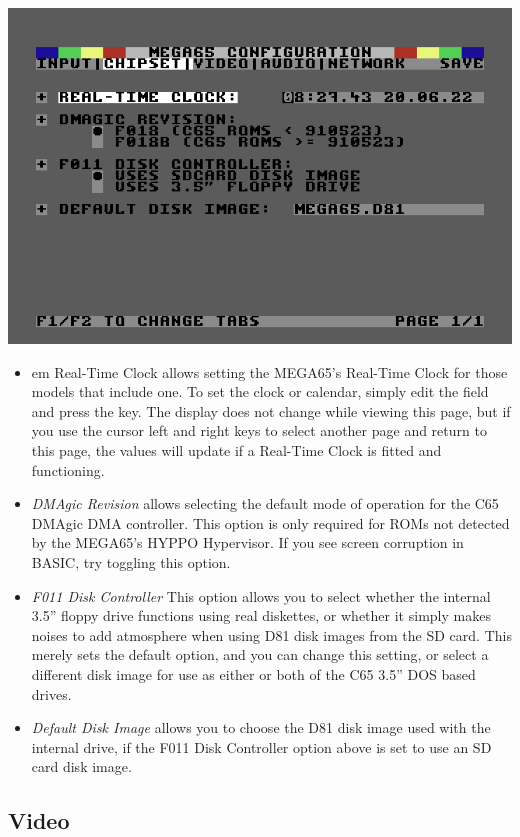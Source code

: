\includegraphics[width=\linewidth]{images/ss-m65config-2.png}

\begin{itemize}
  \item{em Real-Time Clock} allows setting the MEGA65's Real-Time
    Clock for those models that include one.  To set the clock or
    calendar, simply edit the field and press the 
    key.  The display does not change while viewing this page, but if
    you use the cursor left and right keys to select another page and
    return to this page, the values will update if a Real-Time Clock
    is fitted and functioning.
  \item{\em DMAgic Revision} allows selecting the default mode of
    operation for the C65 DMAgic DMA controller.  This option is only
    required for ROMs not detected by the MEGA65's HYPPO Hypervisor.
    If you see screen corruption in BASIC,
    try toggling this option.
  \item{\em F011 Disk Controller}
    This option allows you to select whether the internal 3.5'' floppy
    drive functions using real diskettes, or whether it simply makes
    noises to add atmosphere when using D81 disk images from the SD
    card.  This merely sets the default option, and you can change
    this setting, or select a different disk image for use as either
    or both of the C65 3.5'' DOS based drives.
  \item{\em Default Disk Image} allows you to choose the D81 disk image
    used with the internal drive, if the F011 Disk
    Controller option above is set to use an SD card disk image.
\end{itemize}

\subsection{Video}

